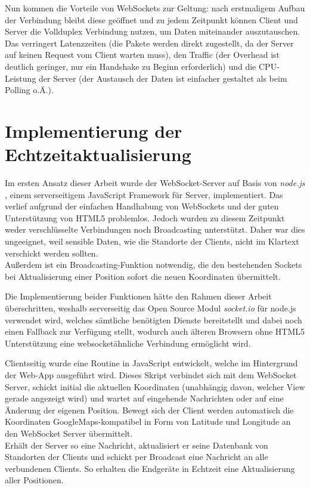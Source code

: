 Nun kommen die Vorteile von WebSockets zur Geltung: nach erstmaligem Aufbau der Verbindung bleibt diese geöffnet und zu jedem Zeitpunkt können Client und Server die Vollduplex Verbindung nutzen, um Daten miteinander auszutauschen. Das verringert Latenzzeiten (die Pakete werden direkt zugestellt, da der Server auf keinen Request vom Client warten muss), den Traffic (der Overhead ist deutlich geringer, nur ein Handshake zu Beginn erforderlich) und die CPU-Leistung der Server (der Austausch der Daten ist einfacher gestaltet als beim Polling o.Ä.).

\section{Implementierung der Echtzeitaktualisierung}
Im ersten Ansatz dieser Arbeit wurde der WebSocket-Server auf Basis von \emph{node.js} \cite{node.js}, einem serverseitigem JavaScript Framework für Server, implementiert. Das verlief aufgrund der einfachen Handhabung von WebSockets und der guten Unterstützung von HTML5 problemlos. Jedoch wurden zu diesem Zeitpunkt weder verschlüsselte Verbindungen noch Broadcasting unterstützt. Daher war dies ungeeignet, weil sensible Daten, wie die Standorte der Clients, nicht im Klartext verschickt werden sollten.\\
Außerdem ist ein Broadcasting-Funktion notwendig, die den bestehenden Sockets bei Aktualisierung einer Position sofort die neuen Koordinaten übermittelt.\par

Die Implementierung beider Funktionen hätte den Rahmen dieser Arbeit überschritten, weshalb serverseitig das Open Source Modul \emph{socket.io} \cite{socket.io} für node.js verwendet wird, welches sämtliche benötigten Dienste bereitstellt und dabei noch einen Fallback zur Verfügung stellt, wodurch auch älteren Browsern ohne HTML5 Unterstützung eine websocketähnliche Verbindung ermöglicht wird.\par

Clientseitig wurde eine Routine in JavaScript entwickelt, welche im Hintergrund der Web-App ausgeführt wird. Dieses Skript verbindet sich mit dem WebSocket Server, schickt initial die aktuellen Koordinaten (unabhängig davon, welcher View gerade angezeigt wird) und wartet auf eingehende Nachrichten oder auf eine Änderung der eigenen Position. Bewegt sich der Client werden automatisch die Koordinaten GoogleMaps-kompatibel in Form von Latitude und Longitude an den WebSocket Server übermittelt.\\
Erhält der Server so eine Nachricht, aktualisiert er seine Datenbank von Standorten der Clients und schickt per Broadcast eine Nachricht an alle verbundenen Clients. So erhalten die Endgeräte in Echtzeit eine Aktualisierung aller Positionen.\par

